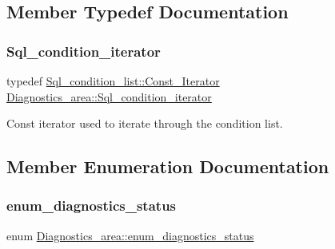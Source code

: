 \subsection{Member Typedef Documentation}
\mbox{\label{classDiagnostics__area_a5302a0cdb7499883092d87a5b901b39d}} 
\subsubsection{\texorpdfstring{Sql\+\_\+condition\+\_\+iterator}{Sql\_condition\_iterator}}
{\footnotesize\ttfamily typedef \mbox{\hyperlink{classI__P__List__iterator}{Sql\+\_\+condition\+\_\+list\+::\+Const\+\_\+\+Iterator}} \mbox{\hyperlink{classDiagnostics__area_a5302a0cdb7499883092d87a5b901b39d}{Diagnostics\+\_\+area\+::\+Sql\+\_\+condition\+\_\+iterator}}}

Const iterator used to iterate through the condition list. 

\subsection{Member Enumeration Documentation}
\mbox{\label{classDiagnostics__area_a841a3c3b3036d95e150bbea3e2c4f131}} 
\subsubsection{\texorpdfstring{enum\+\_\+diagnostics\+\_\+status}{enum\_diagnostics\_status}}
{\footnotesize\ttfamily enum \mbox{\hyperlink{classDiagnostics__area_a841a3c3b3036d95e150bbea3e2c4f131}{Diagnostics\+\_\+area\+::enum\+\_\+diagnostics\+\_\+status}}}

